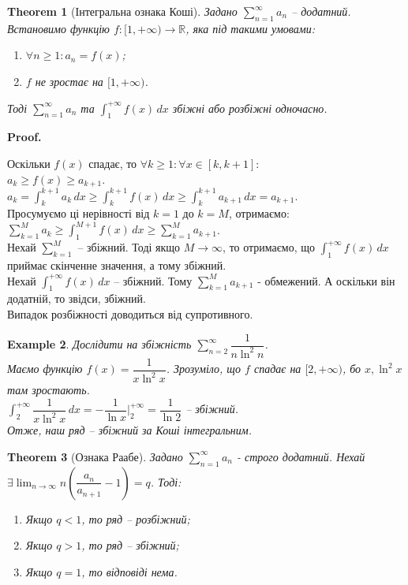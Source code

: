 \documentclass[a4paper, 10pt]{article}
\makeatletter
\def\huge{\displaystyle}
\def\qed{$\blacksquare$}
\theoremstyle{theoremdd}
\newtheorem{theorem}{Theorem}[subsection]
\theoremstyle{theoremdd}
\theoremstyle{theoremdd}
\theoremstyle{theoremdd}
\theoremstyle{theoremdd}
\newtheorem{example}[theorem]{Example}
\theoremstyle{theoremdd}
\theoremstyle{theoremdd}
\theoremstyle{theoremdd}
\theoremstyle{theoremdd}
\renewenvironment{proof}[1][Proof.\\]{\par
\pushQED{\hfill \qed}%
\normalfont \topsep6\p@\@plus6\p@\relax
\trivlist
\item\relax
{\bfseries
#1\@addpunct{.}}\hspace\labelsep\ignorespaces
}{%
\popQED\endtrivlist\@endpefalse
}
\makeatother
\begin{document}
\begin{theorem}[Інтегральна ознака Коші]
Задано $\huge \sum_{n=1}^{\infty} a_n$ -- додатний. Встановимо функцію $f \colon [1,+\infty) \to \mathbb{R}$, яка під такими умовами:
\begin{enumerate}[nosep,wide=0pt,label={\arabic*)}]
\item $\forall n \geq 1: a_n = f(x)$;
\item $f$ не зростає на $[1,+\infty)$.
\end{enumerate}
Тоді $\huge \sum_{n = 1}^\infty a_n$ та $\huge \int_1^{+\infty} f(x)\,dx$ збіжні або розбіжні одночасно.
\end{theorem}

\begin{proof}
Оскільки $f(x)$ спадає, то $\forall k \geq 1: \forall x \in [k, k+1]:$\\
$a_k \geq f(x) \geq a_{k+1}$.\\
$\huge a_k = \int_k^{k+1} a_k \,dx \geq \int_k^{k+1} f(x)\,dx \geq \int_k^{k+1} a_{k+1}\,dx = a_{k+1}$.\\
Просумуємо ці нерівності від $k = 1$ до $k = M$, отримаємо:\\
$\huge \sum_{k=1}^M a_k \geq \int_1^{M+1} f(x)\,dx \geq \sum_{k=1}^M a_{k+1}$.\\
Нехай $\huge\sum_{k=1}^M$ -- збіжний. Тоді якщо $M \to \infty$, то отримаємо, що $\huge\int_1^{+\infty} f(x)\,dx$ приймає скінченне значення, а тому збіжний.\\
Нехай $\huge\int_1^{+\infty} f(x)\,dx$ -- збіжний. Тому $\huge\sum_{k=1}^M a_{k+1}$ - обмежений. А оскільки він додатній, то звідси, збіжний.\\
Випадок розбіжності доводиться від супротивного.
\end{proof}

\begin{example}
Дослідити на збіжність $\huge\sum_{n=2}^\infty \dfrac{1}{n \ln^2 n}$.\\
Маємо функцію $f(x) = \dfrac{1}{x \ln^2 x}$. Зрозуміло, що $f$ спадає на $[2,+\infty)$, бо $x, \ln^2 x$ там зростають.\\
$\huge\int_2^{+\infty} \dfrac{1}{x \ln^2 x}\,dx = -\dfrac{1}{\ln x} \Big|_{2}^{+\infty} = \dfrac{1}{\ln 2}$ -- збіжний.\\
Отже, наш ряд -- збіжний за Коші інтегральним.
\end{example}

\begin{theorem}[Ознака Раабе]
Задано $\huge\sum_{n=1}^\infty a_n$ - строго додатний. Нехай $\exists \huge\lim_{n \to \infty} n \left( \dfrac{a_n}{a_{n+1}} - 1 \right) = q$. Тоді:
\begin{enumerate}[nosep,wide=0pt,label={\arabic*)}]
\item Якщо $q < 1$, то ряд -- розбіжний;
\item Якщо $q > 1$, то ряд -- збіжний;
\item Якщо $q = 1$, то відповіді нема.
\end{enumerate}
\end{theorem}
\end{document}
